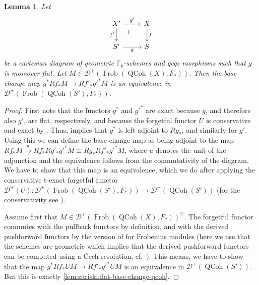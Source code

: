 \documentclass{article}
\theoremstyle{definition}
\theoremstyle{definition}
\theoremstyle{definition}
\theoremstyle{plain}
\newtheorem{lem}[defn]{Lemma}
\theoremstyle{plain}
\theoremstyle{plain}
\theoremstyle{plain}
\theoremstyle{plain}
\theoremstyle{plain}
\theoremstyle{plain}
\theoremstyle{plain}
\theoremstyle{remark}
\theoremstyle{remark}
\theoremstyle{plain}
\theoremstyle{plain}
\theoremstyle{plain}
\theoremstyle{plain}
\theoremstyle{plain}
\newcommand{\Fp}{\mathbb{F}_p}
\newcommand{\cartsymb}{\arrow[dr, phantom,"\scalebox{1.5}{\color{black}$\lrcorner$}", near start, color=black]}
\newcommand{\QCoh}[1]{\operatorname{QCoh}(#1)}
\newcommand{\Frob}[2]{\operatorname{Frob}(#1, #2)}
\newcommand{\Cat}[1]{\mathcal{#1}}
\begin{document}
\begin{lem} \label{lem:zariski:flat-base-change-frob-modules}
    Let
    \[\begin{tikzcd}
        X' \ar[r, "g'"] \ar[d, "f'"'] \cartsymb & X \ar[d, "f"] \\
        S' \ar[r, "g"'] & S
    \end{tikzcd}\]
    be a cartesian diagram of geometric $\Fp$-schemes and qcqs morphisms such that $g$ is moreover flat.
    Let $M \in \Cat D^+ (\Frob{\QCoh{X}}{F_*})$.
    Then the base change map $g^* Rf_* M \to Rf'_* g'^* M$ is an equivalence in $\Cat D^+ (\Frob{\QCoh{S'}}{F_*})$.
\end{lem}
\begin{proof}
    First note that the functors $g^*$ and $g'^*$ are exact because $g$, and therefore also $g'$, are flat, respectively, 
    and because the forgetful functor $U$ is conservative and exact by \cite[Corollary 2.8 (b) and (h)]{cartmod}.
    Thus, \cite[\href{https://stacks.math.columbia.edu/tag/09T5}{Tag 09T5}]{stacks-project} implies that $g^*$ is left adjoint to $Rg_*$,
    and similarly for $g'$.
    Using this we can define the base change map as being adjoint to the map 
    $Rf_* M \xrightarrow{u} Rf_* Rg'_* g'^* M \cong Rg_* Rf'_* g'^* M$,
    where $u$ denotes the unit of the adjunction and the equivalence follows from the commutativity of the diagram.
    We have to show that this map is an equivalence, which we do after applying the conservative t-exact forgetful functor $\Cat D^+(U) \colon \Cat D^+ (\Frob{\QCoh{S'}}{F_*}) \to \Cat D^+(\QCoh{S'})$ 
    (for the conservativity see \cite[Corollary A.5]{cartmod}).

    Assume first that $M \in \Cat D^+(\Frob{\QCoh{X}}{F_*})^\heartsuit$.
    The forgetful functor commutes with the pullback functors by definition,
    and with the derived pushforward functors by the version of \cite[Proposition 6.4.2]{bockle2014cohomological} for Frobenius modules (here we use that the schemes are geometric which implies
    that the derived pushforward functors can be computed using a \v{C}ech resolution, cf.\ \cite[\href{https://stacks.math.columbia.edu/tag/01XL}{Tag 01XL}]{stacks-project}).
    This means, we have to show that the map $g^* Rf_* UM \to Rf'_* g'^* UM$ is an equivalence in $\Cat D^+(\QCoh{S'})$. 
    But this is exactly \cref{lem:zariski:flat-base-change-qcoh}.


\end{proof}
\end{document}
